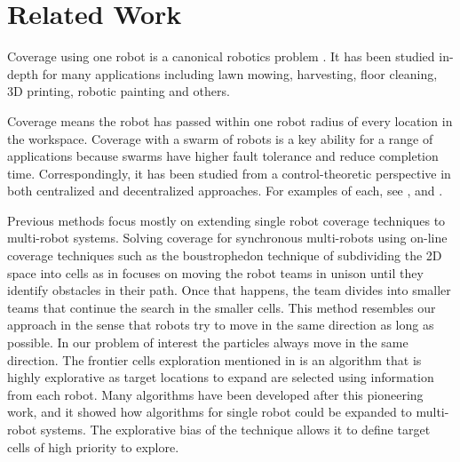 
\section{Related Work}\label{sec:RelatedWork}

Coverage using one robot is a canonical robotics problem \cite{choset2001coverage}. It has been studied in-depth for many applications including lawn mowing, harvesting, floor cleaning, 3D printing, robotic painting and others. 

Coverage means the robot has passed within one robot radius of every location in the workspace. Coverage with a swarm of robots is a key ability for a range of applications because swarms have higher fault tolerance and reduce completion time. Correspondingly, it has been studied from a control-theoretic perspective in  both centralized and decentralized approaches. For examples of each, see  \cite{zheng2005multi}, and \cite{wagner1999distributed}.

Previous methods focus mostly on extending single robot coverage techniques to multi-robot systems. Solving coverage for synchronous multi-robots using on-line coverage techniques such as the boustrophedon technique of subdividing the 2D space into cells as in \cite{latimer2002towards} focuses on moving the robot teams in unison until they identify obstacles in their path. 
Once that happens, the team divides into smaller teams that continue the search in the smaller cells. 
This method resembles our approach in the sense that robots try to move in the same direction as long as possible. 
In our problem of interest the particles always move in the same direction.  
The frontier cells exploration mentioned in \cite{yamauchi1998frontier} is an algorithm that is highly explorative as target locations to expand are selected using information from each robot.
 Many algorithms have been developed after this pioneering work, and it showed how algorithms for single robot could be expanded to multi-robot systems. 
 The explorative bias of the technique allows it to define target cells of high priority to explore.   

